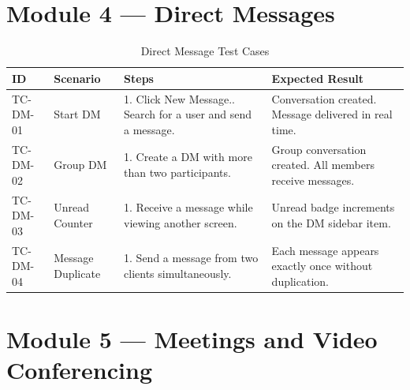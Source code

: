 \documentclass[11pt,a4paper]{report}
\begin{document}
\clearpage

\section{Module 4 --- Direct Messages}

\begin{xltabular}{\textwidth}{|L{2.5cm}|L{2.5cm}|X|L{3.5cm}|}
\caption{Direct Message Test Cases} \\
\hline
{} \textbf{ID} & \textbf{Scenario} & \textbf{Steps} & \textbf{Expected Result} \\ \hline
\endhead

TC-DM-01 & Start DM &
1. Click New Message.. Search for a user and send a message. &
Conversation created. Message delivered in real time. \\ \hline

TC-DM-02 & Group DM &
1. Create a DM with more than two participants. &
Group conversation created. All members receive messages. \\ \hline

TC-DM-03 & Unread Counter &
1. Receive a message while viewing another screen. &
Unread badge increments on the DM sidebar item. \\ \hline

TC-DM-04 & Message Duplicate &
1. Send a message from two clients simultaneously. &
Each message appears exactly once without duplication. \\ \hline
\end{xltabular}

\clearpage

\section{Module 5 --- Meetings and Video Conferencing}
\end{document}
